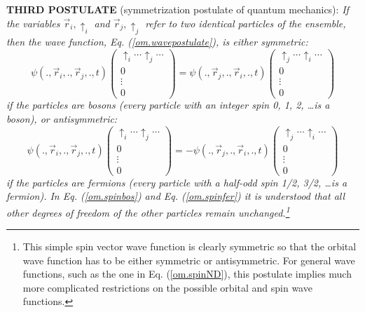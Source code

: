 \documentclass[nofootinbib, secnumarabic, amsmath, nobibnotes,10pt,aps,pra]{revtex4-1}
\newcommand{\eref}[1]{Eq. (\ref{#1})}
\begin{document}
\noindent\textbf{THIRD POSTULATE} (symmetrization postulate of quantum mechanics): \textit{If the variables $\vec r_i,\uparrow_i$ and $\vec r_j,\uparrow_j$ refer to two identical particles of the ensemble, then the wave function, \eref{om.wavepostulate}, is either symmetric:
\begin{equation}
\label{om.spinbos}
\psi(.,\vec r_i,.,\vec r_j,.,t)\!\!\left(
\begin{array}{c}
\uparrow_i\ldots \uparrow_j\ldots\\ 0 \\\vdots\\ 0
\end{array}
\right) = \psi(.,\vec r_j,.,\vec r_i,.,t)\left(
\begin{array}{c}
\uparrow_j\ldots \uparrow_i\ldots\\ 0 \\\vdots\\ 0
\end{array}
\right)
\end{equation}
if the particles are bosons (every particle with an integer spin 0, 1, 2, \ldots is a boson), or antisymmetric:
\begin{equation}
\label{om.spinfer} \psi(.,\vec r_i,.,\vec r_j,.,t)\!\!\left(
\begin{array}{c}
\uparrow_i\ldots \uparrow_j\ldots\\ 0 \\\vdots\\ 0
\end{array}
\right)\!\! = -\psi(.,\vec r_j,.,\vec r_i,.,t)\!\!\left(
\begin{array}{c}
\uparrow_j\ldots \uparrow_i\ldots\\ 0 \\ \vdots \\ 0
\end{array}
\right)
\end{equation}
if the particles are fermions (every particle with a half-odd spin 1/2, 3/2, \ldots is a fermion). In \eref{om.spinbos} and \eref{om.spinfer} it is understood that all other degrees of freedom of the other particles remain unchanged.\footnote{This simple spin vector wave function is clearly symmetric so that the orbital wave function has to be either symmetric or antisymmetric. For general wave functions, such as the one in \eref{om.spinND}, this postulate implies much more complicated restrictions on the possible orbital and spin wave functions.}} \\
\end{document}
